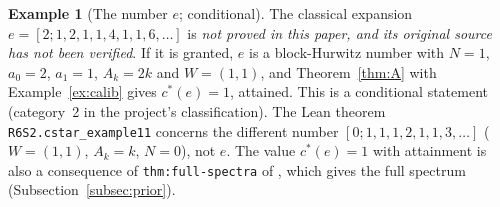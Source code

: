 \documentclass[11pt]{amsart}
\theoremstyle{definition}
\newtheorem{example}[theorem]{Example}
\theoremstyle{remark}
\begin{document}
\begin{example}[The number $e$; conditional]\label{ex:e}
The classical expansion $e=[2;1,2,1,1,4,1,1,6,\dots]$ is \emph{not proved in this paper, and its original source has
not been verified}. If it is granted, $e$ is a block-Hurwitz number with $N=1$, $a_0=2$, $a_1=1$, $A_k=2k$ and
$W=(1,1)$, and Theorem~\ref{thm:A} with Example~\ref{ex:calib} gives $c^*(e)=1$, attained. This is a conditional
statement (category~2 in the project's classification). The Lean theorem \texttt{R6S2.cstar\_example11} concerns the
different number $[0;1,1,1,2,1,1,3,\dots]$ ($W=(1,1)$, $A_k=k$, $N=0$), not $e$. The value $c^*(e)=1$ with
attainment is also a consequence of \texttt{thm:full-spectra} of \cite{P2E}, which gives the full spectrum
(Subsection~\ref{subsec:prior}).
\end{example}
\end{document}
